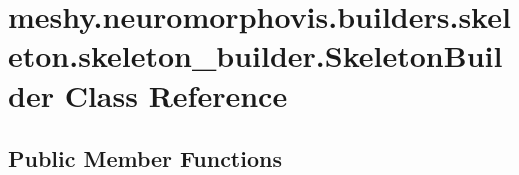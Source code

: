 \hypertarget{classmeshy_1_1neuromorphovis_1_1builders_1_1skeleton_1_1skeleton__builder_1_1SkeletonBuilder}{}\section{meshy.\+neuromorphovis.\+builders.\+skeleton.\+skeleton\+\_\+builder.\+Skeleton\+Builder Class Reference}
\label{classmeshy_1_1neuromorphovis_1_1builders_1_1skeleton_1_1skeleton__builder_1_1SkeletonBuilder}


 


\subsection*{Public Member Functions}

